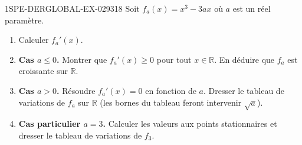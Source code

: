 \begin{exercice}{1SPE-DERGLOBAL-EX-029}{3}{18}
Soit $f_a(x) = x^3 - 3ax$ où $a$ est un réel paramètre.

\begin{enumerate}
\item Calculer $f_a'(x)$.
\item \textbf{Cas $a \leqslant 0$.} Montrer que $f_a'(x) \geqslant 0$ pour tout $x \in \mathbb{R}$. En déduire que $f_a$ est croissante sur $\mathbb{R}$.
\item \textbf{Cas $a > 0$.} Résoudre $f_a'(x) = 0$ en fonction de $a$. Dresser le tableau de variations de $f_a$ sur $\mathbb{R}$ (les bornes du tableau feront intervenir $\sqrt{a}$).
\item \textbf{Cas particulier $a = 3$.} Calculer les valeurs aux points stationnaires et dresser le tableau de variations de $f_3$.
\end{enumerate}
\end{exercice}
